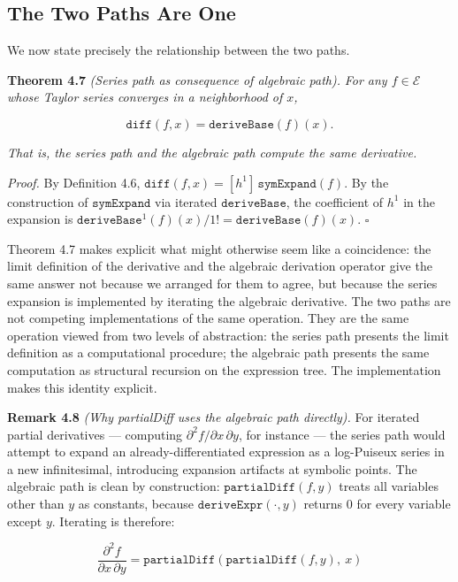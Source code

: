 \documentclass[12pt]{article}
\begin{document}
\subsection{The Two Paths Are One}\label{the-two-paths-are-one}

We now state precisely the relationship between the two paths.

\textbf{Theorem 4.7} \emph{(Series path as consequence of algebraic
path).} \emph{For any \(f \in \mathcal{E}\) whose Taylor series
converges in a neighborhood of \(x\),}

\[\mathtt{diff}(f, x) = \mathtt{deriveBase}(f)(x).\]

\emph{That is, the series path and the algebraic path compute the same
derivative.}

\emph{Proof.} By Definition 4.6,
\(\mathtt{diff}(f, x) = [h^1]\,\mathtt{symExpand}(f)\). By the
construction of \(\mathtt{symExpand}\) via iterated
\(\mathtt{deriveBase}\), the coefficient of \(h^1\) in the expansion is
\(\mathtt{deriveBase}^1(f)(x)/1! = \mathtt{deriveBase}(f)(x)\).
\(\square\)

Theorem 4.7 makes explicit what might otherwise seem like a coincidence:
the limit definition of the derivative and the algebraic derivation
operator give the same answer not because we arranged for them to agree,
but because the series expansion is implemented by iterating the
algebraic derivative. The two paths are not competing implementations of
the same operation. They are the same operation viewed from two levels
of abstraction: the series path presents the limit definition as a
computational procedure; the algebraic path presents the same
computation as structural recursion on the expression tree. The
implementation makes this identity explicit.

\textbf{Remark 4.8} \emph{(Why partialDiff uses the algebraic path
directly).} For iterated partial derivatives --- computing
\(\partial^2 f / \partial x \, \partial y\), for instance --- the series
path would attempt to expand an already-differentiated expression as a
log-Puiseux series in a new infinitesimal, introducing expansion
artifacts at symbolic points. The algebraic path is clean by
construction: \(\mathtt{partialDiff}(f, y)\) treats all variables other
than \(y\) as constants, because \(\mathtt{deriveExpr}(\cdot, y)\)
returns \(0\) for every variable except \(y\). Iterating is therefore:

\[\frac{\partial^2 f}{\partial x \, \partial y} = \mathtt{partialDiff}(\mathtt{partialDiff}(f, y),\ x)\]
\end{document}
